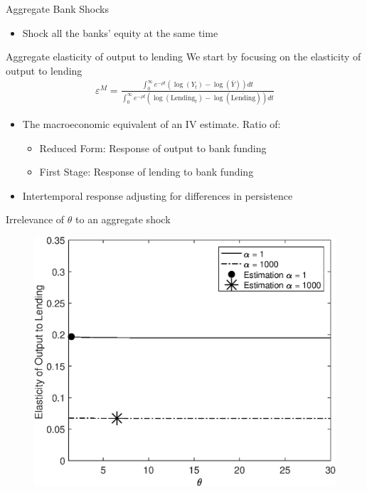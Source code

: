 \documentclass[english,xcolor=svgnames]{beamer}
\begin{document}
 
\begin{frame}{Aggregate Bank Shocks}
\begin{itemize}
\item Shock all the banks' equity at the same time
\end{itemize}
\end{frame}

\begin{frame}{Aggregate elasticity of output to lending}
We start by focusing on the elasticity of output to lending
\begin{align}
\varepsilon^M = \frac{\int_0^{\infty} e^{-\rho t} \left(\log(Y_t) - \log(\bar{Y})\right) dt} {\int_0^{\infty} e^{-\rho t} \left( \log(\text{Lending}_t)  - \log(\bar{\text{Lending}})\right) dt}
\end{align}

\begin{itemize}
\item The macroeconomic equivalent of an IV estimate. Ratio of:
\begin{itemize}
	\item Reduced Form: Response of output to bank funding
	\item First Stage: Response of lending to bank funding
\end{itemize}
\item Intertemporal response adjusting for differences in persistence
\end{itemize}
\end{frame}



\begin{frame}{Irrelevance of $\theta$ to an aggregate shock}
\begin{figure}
\includegraphics[scale=0.5]{Figures/output_loop_theta.eps}
\end{figure}
\end{frame}
\end{document}
